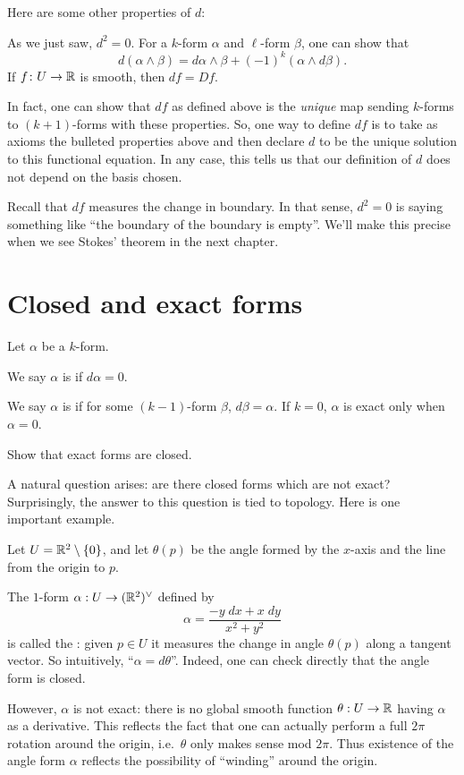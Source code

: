 Here are some other properties of $d$:
\begin{itemize}
	\ii As we just saw, $d^2 = 0$.
	\ii For a $k$-form $\alpha$ and $\ell$-form $\beta$, one can show that
	\[ d(\alpha \wedge \beta) = d\alpha \wedge \beta + (-1)^k (\alpha \wedge d\beta). \]
	\ii If $f \colon U \to \mathbb R$ is smooth, then $df = Df$.
\end{itemize}
In fact, one can show that $df$ as defined above is
the \emph{unique} map sending $k$-forms to $(k+1)$-forms
with these properties.
So, one way to define $df$ is to take as axioms
the bulleted properties above
and then declare $d$ to be the unique solution to this functional equation.
In any case, this tells us that our definition of $d$
does not depend on the basis chosen.

Recall that $df$ measures the change in boundary.
In that sense, $d^2 = 0$ is saying something like
``the boundary of the boundary is empty''.
We'll make this precise when we see Stokes' theorem in the next chapter.

\section{Closed and exact forms}
Let $\alpha$ be a $k$-form.
\begin{definition}
	We say $\alpha$ is  if $d\alpha = 0$.
\end{definition}
\begin{definition}
	We say $\alpha$ is  if for some $(k-1)$-form $\beta$,
	$d\beta = \alpha$.  If $k = 0$, $\alpha$ is exact only when $\alpha = 0$.
\end{definition}
\begin{ques}
	Show that exact forms are closed.
\end{ques}

A natural question arises: are there closed forms
which are not exact?
Surprisingly, the answer to this question is tied to topology.
Here is one important example.

\begin{example}
	\label{ex:angle_form}
	Let $U = \mathbb R^2 \setminus \{0\}$,
	and let $\theta(p)$ be the angle formed by the $x$-axis
	and the line from the origin to $p$.

	The $1$-form $\alpha : U \to (\mathbb R^2)^\vee$ defined by
	\[ \alpha = \frac{-y \; dx + x \; dy}{x^2+y^2} \]
	is called the :
	given $p \in U$ it measures the change in angle $\theta(p)$
	along a tangent vector.
	So intuitively, ``$\alpha = d\theta$''.
	Indeed, one can check directly that the angle form is closed.

	However, $\alpha$ is not exact: there is no global smooth
	function $\theta : U \to \mathbb R$ having $\alpha$ as a derivative.
	This reflects the fact that one can actually perform
	a full $2\pi$ rotation around the origin, i.e.\ $\theta$
	only makes sense mod $2\pi$.
	Thus existence of the angle form $\alpha$ reflects
	the possibility of ``winding'' around the origin.
\end{example}

